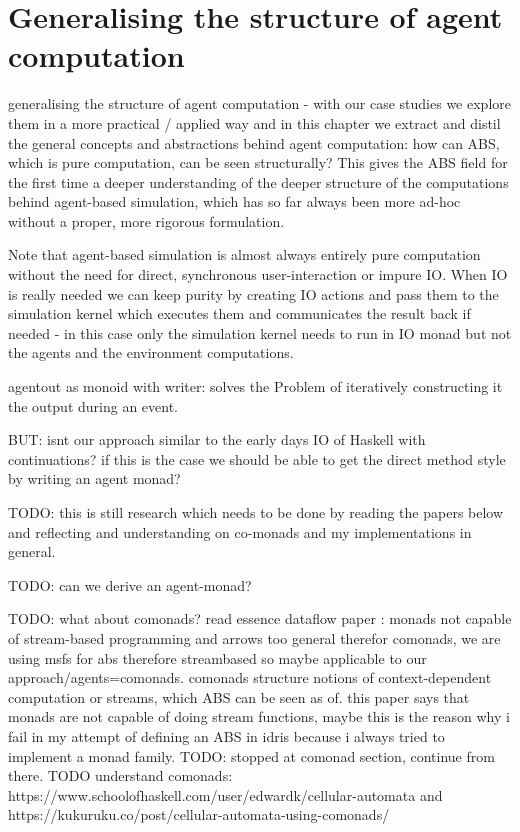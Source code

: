 \chapter{Generalising the structure of agent computation}
generalising the structure of agent computation - with our case studies we explore them in a more practical / applied way and in this chapter we extract and distil the general concepts and abstractions behind agent computation: how can ABS, which is pure computation, can be seen structurally? This gives the ABS field for the first time a deeper understanding of the deeper structure of the computations behind agent-based simulation, which has so far always been more ad-hoc without a proper, more rigorous formulation. 

Note that agent-based simulation is almost always entirely pure computation without the need for direct, synchronous user-interaction or impure IO. When IO is really needed we can keep purity by creating IO actions and pass them to the simulation kernel which executes them and communicates the result back if needed - in this case only the simulation kernel needs to run in IO monad but not the agents and the environment computations.

agentout as monoid with writer: solves the Problem of iteratively constructing it the output during an event.

BUT: isnt our approach similar to the early days IO of Haskell with continuations? if this is the case we should be able to get the direct method style by writing an agent monad?

TODO: this is still research which needs to be done by reading the papers below and reflecting  and understanding on co-monads and my implementations in general.

TODO: can we derive an agent-monad?

TODO: what about comonads? read essence dataflow paper \cite{uustalu_essence_2006}: monads not capable of stream-based programming and arrows too general therefor comonads, we are using msfs for abs therefore streambased so maybe applicable to our approach/agents=comonads. comonads structure notions of context-dependent computation or streams, which ABS can be seen as of. this paper says that monads are not capable of doing stream functions, maybe this is the reason why i fail in my attempt of defining an ABS in idris because i always tried to implement a monad family. TODO: stopped at comonad section, continue from there. TODO understand comonads: https://www.schoolofhaskell.com/user/edwardk/cellular-automata and https://kukuruku.co/post/cellular-automata-using-comonads/

